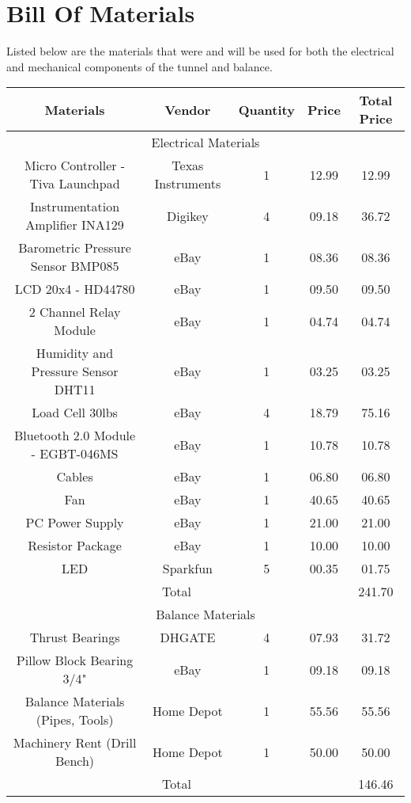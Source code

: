 \section{Bill Of Materials}
	Listed below are the materials that were and will be used for both the electrical and mechanical
	components of the tunnel and balance. \\

	\noindent
	\renewcommand{\arraystretch}{1.0}
	\begin{tabular}{|c|c|c|c|c|}
		\hline
			\rowcolor{gray!50} \textbf{Materials} & \textbf{Vendor} & \textbf{Quantity} & \textbf{Price} & \textbf{Total Price}  \\
		\hline
			\multicolumn{5}{|c|}{Electrical Materials} \\
		\hline
			Micro Controller - Tiva Launchpad 	& Texas Instruments 	& 1 & 12.99 & 12.99 \\
			Instrumentation Amplifier INA129 	& Digikey 				& 4 & 09.18 & 36.72 \\
			Barometric Pressure Sensor BMP085 	& eBay 					& 1 & 08.36 & 08.36 \\
			LCD 20x4 - HD44780				 	& eBay 					& 1 & 09.50 & 09.50 \\
			2 Channel Relay Module			 	& eBay 					& 1 & 04.74 & 04.74 \\
			Humidity and Pressure Sensor DHT11	& eBay 					& 1 & 03.25 & 03.25 \\
			Load Cell 30lbs						& eBay					& 4 & 18.79 & 75.16 \\
			Bluetooth 2.0 Module - EGBT-046MS	& eBay					& 1 & 10.78 & 10.78 \\
			Cables								& eBay					& 1 & 06.80 & 06.80 \\
			Fan									& eBay					& 1 & 40.65 & 40.65 \\
			PC Power Supply						& eBay					& 1 & 21.00 & 21.00 \\
			Resistor Package					& eBay					& 1 & 10.00	& 10.00 \\
			LED									& Sparkfun				& 5 & 00.35 & 01.75 \\
		\hline
			\multicolumn{4}{|c|}{Total}		& 241.70 \\
		\hline
			\multicolumn{5}{|c|}{Balance Materials} \\
		\hline
			Thrust Bearings						& DHGATE				& 4 & 07.93 & 31.72 \\
			Pillow Block Bearing 3/4"			& eBay					& 1 & 09.18 & 09.18 \\
			Balance Materials (Pipes, Tools)	& Home Depot			& 1 & 55.56 & 55.56 \\
			Machinery Rent (Drill Bench)		& Home Depot			& 1 & 50.00 & 50.00 \\
		\hline
			\multicolumn{4}{|c|}{Total}		& 146.46 \\


\end{tabular}
